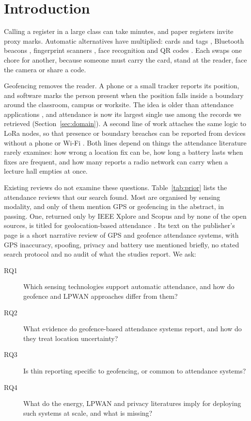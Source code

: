 \documentclass[preprint,12pt]{elsarticle}
\begin{document}
\section{Introduction}
Calling a register in a large class can take minutes, and paper registers invite proxy marks. Automatic alternatives have multiplied: cards and tags \cite{@36,@86,@210}, Bluetooth beacons \cite{@159,@165}, fingerprint scanners \cite{@47,@168}, face recognition \cite{@16,@33,@78} and QR codes \cite{@61}. Each swaps one chore for another, because someone must carry the card, stand at the reader, face the camera or share a code.

Geofencing removes the reader. A phone or a small tracker reports its position, and software marks the person present when the position falls inside a boundary around the classroom, campus or worksite. The idea is older than attendance applications \cite{reclus2009geofencing,@175}, and attendance is now its largest single use among the records we retrieved (Section~\ref{sec:domain}). A second line of work attaches the same logic to LoRa nodes, so that presence or boundary breaches can be reported from devices without a phone or Wi-Fi \cite{@357,@1235}. Both lines depend on things the attendance literature rarely examines: how wrong a location fix can be, how long a battery lasts when fixes are frequent, and how many reports a radio network can carry when a lecture hall empties at once.

Existing reviews do not examine these questions. Table~\ref{tab:prior} lists the \nPriorSel{} attendance reviews that our search found. Most are organised by sensing modality, and only \nPriorGps{} of them mention GPS or geofencing in the abstract, in passing. One, returned only by IEEE Xplore and Scopus and by none of the open sources, is titled for geolocation-based attendance \cite{@3025}. Its text on the publisher's page is a short narrative review of GPS and geofence attendance systems, with GPS inaccuracy, spoofing, privacy and battery use mentioned briefly, no stated search protocol and no audit of what the studies report. We ask:
\begin{description}
\item[RQ1] Which sensing technologies support automatic attendance, and how do geofence and LPWAN approaches differ from them?
\item[RQ2] What evidence do geofence-based attendance systems report, and how do they treat location uncertainty?
\item[RQ3] Is thin reporting specific to geofencing, or common to attendance systems?
\item[RQ4] What do the energy, LPWAN and privacy literatures imply for deploying such systems at scale, and what is missing?
\end{description}
\end{document}
